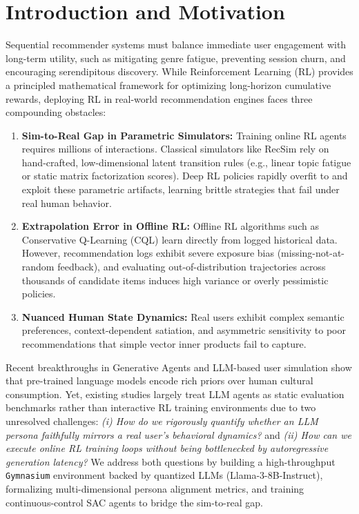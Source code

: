 \documentclass{article}
\begin{document}
\section{Introduction and Motivation}
Sequential recommender systems must balance immediate user engagement with long-term utility, such as mitigating genre fatigue, preventing session churn, and encouraging serendipitous discovery. While Reinforcement Learning (RL) provides a principled mathematical framework for optimizing long-horizon cumulative rewards, deploying RL in real-world recommendation engines faces three compounding obstacles:
\begin{enumerate}
    \item \textbf{Sim-to-Real Gap in Parametric Simulators:} Training online RL agents requires millions of interactions. Classical simulators like RecSim \cite{ie2019recsim} rely on hand-crafted, low-dimensional latent transition rules (e.g., linear topic fatigue or static matrix factorization scores). Deep RL policies rapidly overfit to and exploit these parametric artifacts, learning brittle strategies that fail under real human behavior.
    \item \textbf{Extrapolation Error in Offline RL:} Offline RL algorithms such as Conservative Q-Learning (CQL) \cite{kumar2020conservative, levine2020offline} learn directly from logged historical data. However, recommendation logs exhibit severe exposure bias (missing-not-at-random feedback), and evaluating out-of-distribution trajectories across thousands of candidate items induces high variance or overly pessimistic policies.
    \item \textbf{Nuanced Human State Dynamics:} Real users exhibit complex semantic preferences, context-dependent satiation, and asymmetric sensitivity to poor recommendations that simple vector inner products fail to capture.
\end{enumerate}

Recent breakthroughs in Generative Agents \cite{park2023generative} and LLM-based user simulation \cite{wang2023generative, zhang2024agent4rec, wang2024user} show that pre-trained language models encode rich priors over human cultural consumption. Yet, existing studies largely treat LLM agents as static evaluation benchmarks rather than interactive RL training environments due to two unresolved challenges: \textit{(i) How do we rigorously quantify whether an LLM persona faithfully mirrors a real user's behavioral dynamics?} and \textit{(ii) How can we execute online RL training loops without being bottlenecked by autoregressive generation latency?} We address both questions by building a high-throughput \texttt{Gymnasium} environment backed by quantized LLMs (Llama-3-8B-Instruct), formalizing multi-dimensional persona alignment metrics, and training continuous-control SAC agents to bridge the sim-to-real gap.
\end{document}
